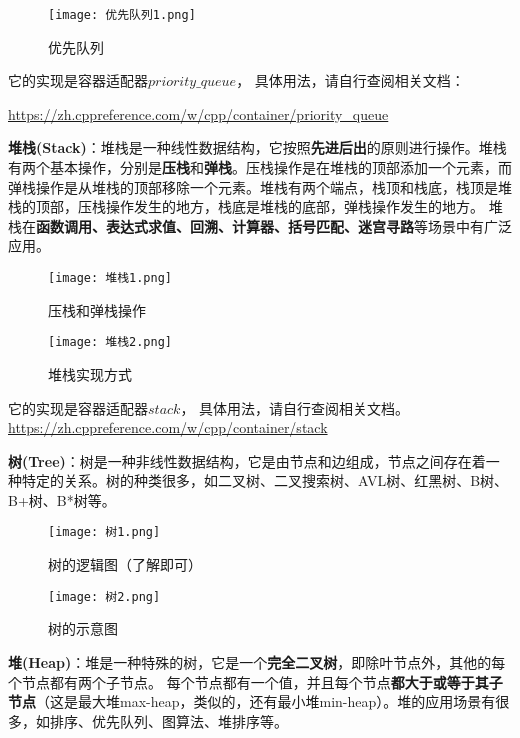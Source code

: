 \begin{figure}[H]
    \centering
    \texttt{[image: 优先队列1.png]}
    \caption{优先队列} %
    \label{fig:优先队列} %
\end{figure}

它的实现是容器适配器$priority\_queue$，
具体用法，请自行查阅相关文档：

\url{https://zh.cppreference.com/w/cpp/container/priority_queue}


\textbf{堆栈(Stack)}：堆栈是一种线性数据结构，它按照\textbf{先进后出}的原则进行操作。堆栈有两个基本操作，分别是\textbf{压栈}和\textbf{弹栈}。压栈操作是在堆栈的顶部添加一个元素，而弹栈操作是从堆栈的顶部移除一个元素。堆栈有两个端点，栈顶和栈底，栈顶是堆栈的顶部，压栈操作发生的地方，栈底是堆栈的底部，弹栈操作发生的地方。
堆栈在\textbf{函数调用、表达式求值、回溯、计算器、括号匹配、迷宫寻路}等场景中有广泛应用。

\begin{figure}[H]
    \centering
    \texttt{[image: 堆栈1.png]}
    \caption{压栈和弹栈操作} %
    \label{fig:入队和出队操作} %
\end{figure}
\begin{figure}[H]
    \centering
    \texttt{[image: 堆栈2.png]}
    \caption{堆栈实现方式} %
    \label{fig:队列实现方式} %
\end{figure}

它的实现是容器适配器$stack$，
具体用法，请自行查阅相关文档。
\url{https://zh.cppreference.com/w/cpp/container/stack}

\textbf{树(Tree)}：树是一种非线性数据结构，它是由节点和边组成，节点之间存在着一种特定的关系。树的种类很多，如二叉树、二叉搜索树、AVL树、红黑树、B树、B+树、B*树等。
\begin{figure}[H]
    \centering
    \texttt{[image: 树1.png]}
    \caption{树的逻辑图（了解即可）} %
    \label{fig:队列实现方式} %
\end{figure}

\begin{figure}[H]
    \centering
    \texttt{[image: 树2.png]}
    \caption{树的示意图} %
    \label{fig:队列实现方式} %
\end{figure}

\textbf{堆(Heap)}：堆是一种特殊的树，它是一个\textbf{完全二叉树}，即除叶节点外，其他的每个节点都有两个子节点。
每个节点都有一个值，并且每个节点\textbf{都大于或等于其子节点}（这是最大堆max-heap，类似的，还有最小堆min-heap）。堆的应用场景有很多，如排序、优先队列、图算法、堆排序等。

